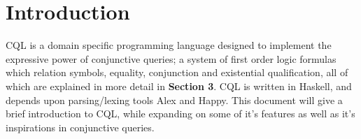 \section{Introduction}
CQL is a domain specific programming language designed to implement the expressive power of conjunctive queries; a system of first order logic formulas which relation symbols, equality, conjunction and existential qualification, all of which are explained in more detail in \textbf{Section 3}. CQL is written in Haskell, and depends upon parsing/lexing tools Alex and Happy. This document will give a brief introduction to CQL, while expanding on some of it's features as well as it's inspirations in conjunctive queries.